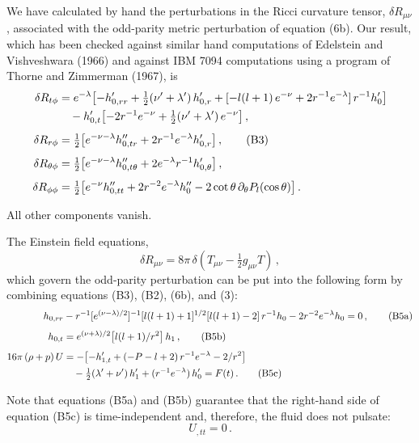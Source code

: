 \documentclass[12pt]{article}
\begin{document}
We have calculated by hand the perturbations in the Ricci curvature tensor, $\delta R_{\mu\nu}$,
associated with the odd-parity metric perturbation of equation (6b). Our result, which has been checked
against similar hand computations of Edelstein and Vishveshwara (1966) and against IBM 7094
computations using a program of Thorne and Zimmerman (1967), is
%
\begin{align}
\delta R_{t\phi} &=
    e^{-\lambda}\bigl[{-h_{0,rr}'} + \tfrac{1}{2}(\nu'+\lambda')\,h_{0,r}'
    + [-l(l+1)\,e^{-\nu} + 2r^{-1}e^{-\lambda}]\,r^{-1}h_0'\bigr]
\notag \\
&\quad
    - h_{0,t}'\bigl[-2r^{-1}e^{-\nu} + \tfrac{1}{2}(\nu'+\lambda')\,e^{-\nu}\bigr] \,,
\notag \\[4pt]
\delta R_{r\phi} &=
    \tfrac{1}{2}\bigl[e^{-\nu-\lambda}h_{0,tr}'' + 2r^{-1}e^{-\lambda}h_{0,r}'\bigr] \,,
\tag{B3} \\[4pt]
\delta R_{\theta\phi} &=
    \tfrac{1}{2}\bigl[e^{-\nu-\lambda}h_{0,t\theta}'' + 2e^{-\lambda}r^{-1}h_{0,\theta}'\bigr] \,,
\notag \\[4pt]
\delta R_{\phi\phi} &=
    \tfrac{1}{2}\bigl[e^{-\nu}h_{0,tt}'' + 2r^{-2}e^{-\lambda}h_0''
    - 2\cot\theta\,\partial_\theta P_l(\cos\theta)\bigr] \,.
\notag
\end{align}

All other components vanish.

The Einstein field equations,
%
\begin{equation}
\delta R_{\mu\nu} = 8\pi\,\delta\!\left(T_{\mu\nu} - \tfrac{1}{2}g_{\mu\nu}T\right) \,,
\tag{B4}
\end{equation}
%
which govern the odd-parity perturbation can be put into the following form by combining
equations (B3), (B2), (6b), and (3):
%
\begin{align}
h_{0,rr} &- r^{-1}[e^{(\nu-\lambda)/2}]^{-1}[l(l+1)+1]^{1/2}[l(l+1)-2]\,r^{-1}h_0
    - 2r^{-2}e^{-\lambda}h_0 = 0 \,,
\tag{B5a} \\[4pt]
h_{0,t} &= e^{(\nu+\lambda)/2}\bigl[l(l+1)/r^2\bigr]\,h_1 \,,
\tag{B5b} \\[4pt]
16\pi\,(\rho+p)\,U &=
    -\bigl[{-h_{1,t}'} + (-P-l+2)\,r^{-1}e^{-\lambda} - 2/r^2\bigr]
\notag \\
&\quad
    - \tfrac{1}{2}(\lambda'+\nu')\,h_1'
    + (r^{-1}e^{-\lambda})\,h_0' = F(t) \,.
\tag{B5c}
\end{align}

Note that equations (B5a) and (B5b) guarantee that the right-hand side of equation (B5c) is
time-independent and, therefore, the fluid does not pulsate:
%
\begin{equation}
U_{,tt} = 0 \,.
\tag{B6}
\end{equation}
\end{document}
